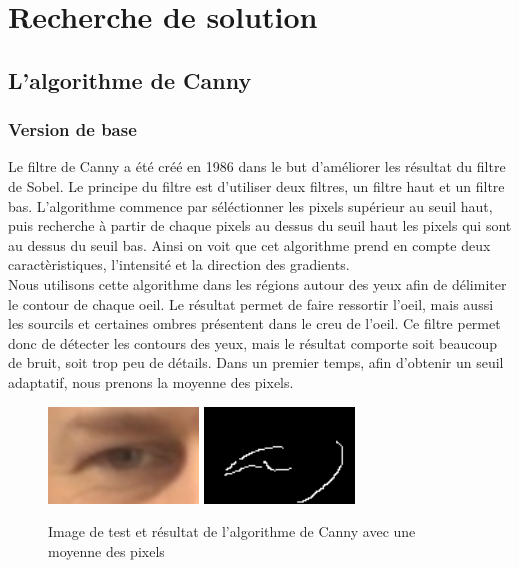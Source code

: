 \section{Recherche de solution}

\subsection{L'algorithme de Canny}

\subsubsection{Version de base}
Le filtre de Canny a été créé en 1986 dans le but d'améliorer les résultat du filtre de Sobel.
Le principe du filtre est d'utiliser deux filtres, un filtre haut et un filtre bas. L'algorithme
commence par séléctionner les pixels supérieur au seuil haut, puis recherche à partir de chaque
pixels au dessus du seuil haut les pixels qui sont au dessus du seuil bas. Ainsi on voit 
que cet algorithme prend en compte deux caractèristiques, l'intensité et la direction des 
gradients.\\

Nous utilisons cette algorithme dans les régions autour des yeux afin de délimiter le contour
de chaque oeil. Le résultat permet de faire ressortir l'oeil, mais aussi les sourcils et certaines
ombres présentent dans le creu de l'oeil. Ce filtre permet donc de détecter les contours des yeux,
mais le résultat comporte soit beaucoup de bruit, soit trop peu de détails. Dans un premier
temps, afin d'obtenir un seuil adaptatif, nous prenons la moyenne des pixels.

\begin{figure}[H]
 \center
 \includegraphics[width=4cm]{image/original.png}
 \includegraphics[width=4cm]{image/canny_moyenne.png}
 \caption{Image de test et résultat de l'algorithme de Canny avec une moyenne des pixels}
\end{figure}

